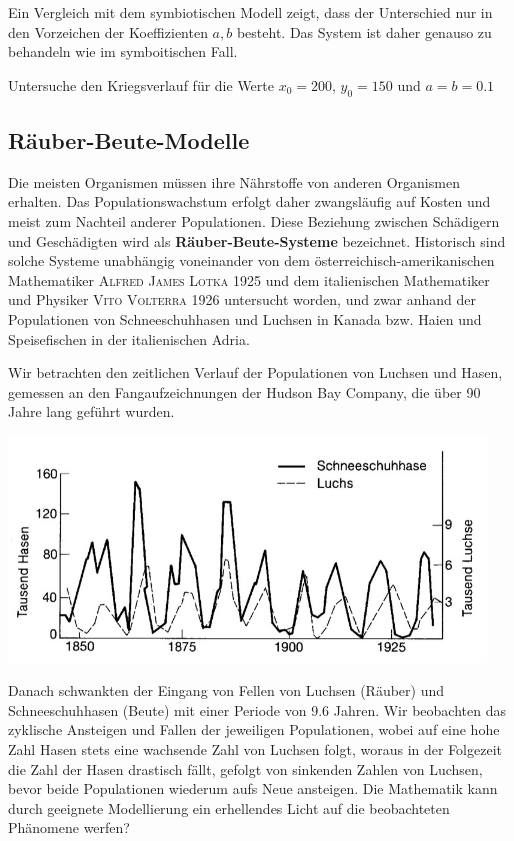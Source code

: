 \documentclass[%
11pt,%
twoside,%
titlepage,%
german,%
headsepline%
]{scrartcl}
\begin{document}
Ein Vergleich mit dem symbiotischen Modell zeigt, dass der Unterschied nur in den Vorzeichen der Koeffizienten $a,b$ besteht. Das System ist daher genauso zu behandeln wie im symboitischen Fall.

\begin{ueb}[Kriegsverlauf]
Untersuche den Kriegsverlauf für die Werte $x_0=200$, $y_0=150$ und $a=b=0.1$
\end{ueb}

\subsection{Räuber-Beute-Modelle}

Die meisten Organismen müssen ihre Nährstoffe von anderen Organismen erhalten. Das Populationswachstum erfolgt daher zwangsläufig auf Kosten und meist zum Nachteil anderer Populationen. Diese Beziehung zwischen Schädigern und Geschädigten wird als \textbf{Räuber-Beute-Systeme} bezeichnet. Historisch sind solche Systeme unabhängig voneinander von dem österreichisch-amerikanischen Mathematiker \textsc{Alfred James Lotka} 1925 und dem italienischen
Mathematiker und Physiker \textsc{Vito Volterra} 1926 untersucht worden, und zwar anhand der Populationen von Schneeschuhhasen und Luchsen in Kanada bzw. Haien und Speisefischen in der italienischen Adria.

Wir betrachten den zeitlichen Verlauf der Populationen von Luchsen
und Hasen, gemessen an den Fangaufzeichnungen der Hudson Bay Company,
die über 90 Jahre lang geführt wurden.

\begin{center}
\includegraphics[height=6cm]{pictures/haseluchs.jpg}
\end{center}

Danach schwankten der Eingang von Fellen von Luchsen (Räuber) und Schneeschuhhasen (Beute) mit einer Periode von 9.6 Jahren. Wir beobachten das zyklische Ansteigen und Fallen der
jeweiligen Populationen, wobei auf eine hohe Zahl Hasen stets eine wachsende Zahl von Luchsen folgt, woraus in der Folgezeit die Zahl der Hasen drastisch fällt, gefolgt von sinkenden Zahlen von Luchsen, bevor beide Populationen wiederum aufs Neue ansteigen. Die Mathematik kann durch geeignete Modellierung ein erhellendes Licht auf die beobachteten Phänomene werfen?
\end{document}
